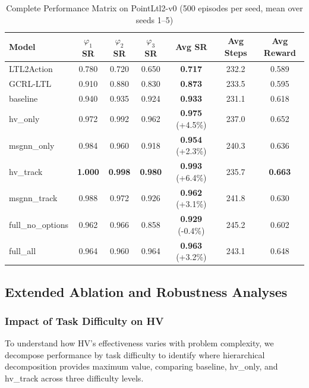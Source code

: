 \documentclass[journal]{IEEEtran}
\begin{document}
\begin{table}[t]
\centering
\caption{Complete Performance Matrix on PointLtl2-v0 (500 episodes per seed, mean over seeds 1--5)}
\label{tab:overall_performance}
\begin{tabular}{@{}lcccccc@{}}
\toprule
\textbf{Model} & \textbf{$\varphi_1$ SR} & \textbf{$\varphi_2$ SR} & \textbf{$\varphi_3$ SR} & \textbf{Avg SR} & \textbf{Avg Steps} & \textbf{Avg Reward} \\ \midrule
LTL2Action & 0.780 & 0.720 & 0.650 & \textbf{0.717} & 232.2 & 0.589 \\
GCRL-LTL & 0.910 & 0.880 & 0.830 & \textbf{0.873} & 233.5 & 0.595 \\
\midrule
baseline & 0.940 & 0.935 & 0.924 & \textbf{0.933} & 231.1 & 0.618 \\
hv\_only & 0.972 & 0.992 & 0.962 & \textbf{0.975} (+4.5\%) & 237.0 & 0.652 \\
msgnn\_only & 0.984 & 0.960 & 0.918 & \textbf{0.954} (+2.3\%) & 240.3 & 0.636 \\
hv\_track & \textbf{1.000} & \textbf{0.998} & \textbf{0.980} & \textbf{0.993} (+6.4\%) & 235.7 & \textbf{0.663} \\
msgnn\_track & 0.988 & 0.972 & 0.926 & \textbf{0.962} (+3.1\%) & 241.8 & 0.630 \\
full\_no\_options & 0.962 & 0.966 & 0.858 & \textbf{0.929} (-0.4\%) & 245.2 & 0.602 \\
full\_all & 0.964 & 0.960 & 0.964 & \textbf{0.963} (+3.2\%) & 243.1 & 0.648 \\ \bottomrule
\end{tabular}
\end{table}

\subsection{Extended Ablation and Robustness Analyses}
\label{sec:extended_ablation}
\subsubsection{Impact of Task Difficulty on HV}

To understand how HV's effectiveness varies with problem complexity, we decompose performance by task difficulty to identify where hierarchical decomposition provides maximum value, comparing baseline, hv\_only, and hv\_track across three difficulty levels.
\end{document}

